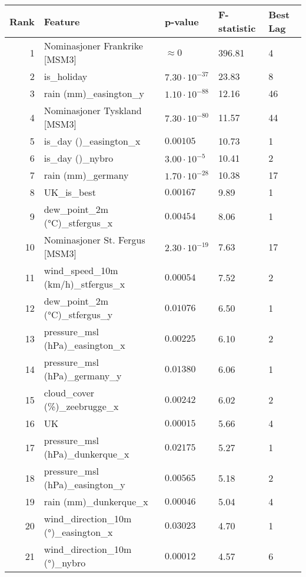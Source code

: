 \begin{table}[H]
    \centering
    \small
    \begin{tabular}{r l l l l}
        \hline
        \textbf{Rank} & \textbf{Feature} & \textbf{p-value} & \textbf{F-statistic} & \textbf{Best Lag} \\
        \hline
        1 & Nominasjoner Frankrike [MSM3] & $\approx 0$ & 396.81 & 4 \\
        2 & is\_holiday & $7.30 \cdot 10^{-37}$ & 23.83 & 8 \\
        3 & rain (mm)\_easington\_y & $1.10 \cdot 10^{-88}$ & 12.16 & 46 \\
        4 & Nominasjoner Tyskland [MSM3] & $7.30 \cdot 10^{-80}$ & 11.57 & 44 \\
        5 & is\_day ()\_easington\_x & $0.00105$ & 10.73 & 1 \\
        6 & is\_day ()\_nybro & $3.00 \cdot 10^{-5}$ & 10.41 & 2 \\
        7 & rain (mm)\_germany & $1.70 \cdot 10^{-28}$ & 10.38 & 17 \\
        8 & UK\_is\_best & $0.00167$ & 9.89 & 1 \\
        9 & dew\_point\_2m (°C)\_stfergus\_x & $0.00454$ & 8.06 & 1 \\
        10 & Nominasjoner St. Fergus [MSM3] & $2.30 \cdot 10^{-19}$ & 7.63 & 17 \\
        11 & wind\_speed\_10m (km/h)\_stfergus\_x & $0.00054$ & 7.52 & 2 \\
        12 & dew\_point\_2m (°C)\_stfergus\_y & $0.01076$ & 6.50 & 1 \\
        13 & pressure\_msl (hPa)\_easington\_x & $0.00225$ & 6.10 & 2 \\
        14 & pressure\_msl (hPa)\_germany\_y & $0.01380$ & 6.06 & 1 \\
        15 & cloud\_cover (\%)\_zeebrugge\_x & $0.00242$ & 6.02 & 2 \\
        16 & UK & $0.00015$ & 5.66 & 4 \\
        17 & pressure\_msl (hPa)\_dunkerque\_x & $0.02175$ & 5.27 & 1 \\
        18 & pressure\_msl (hPa)\_easington\_y & $0.00565$ & 5.18 & 2 \\
        19 & rain (mm)\_dunkerque\_x & $0.00046$ & 5.04 & 4 \\
        20 & wind\_direction\_10m (°)\_easington\_x & $0.03023$ & 4.70 & 1 \\
        21 & wind\_direction\_10m (°)\_nybro & $0.00012$ & 4.57 & 6 \\

\end{tabular}
\end{table}

